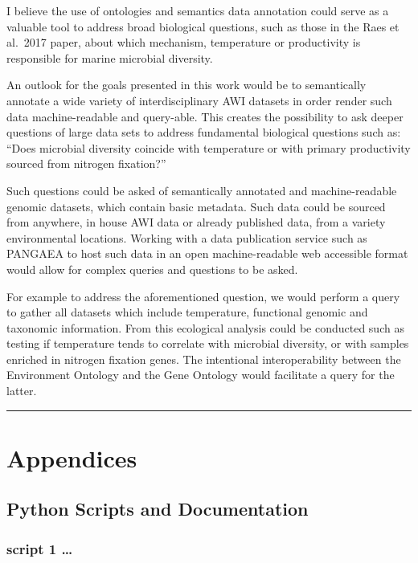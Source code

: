 \documentclass[]{article}
\begin{document}
I believe the use of ontologies and semantics data annotation could
serve as a valuable tool to address broad biological questions, such as
those in the Raes et al.~2017 paper, about which mechanism, temperature
or productivity is responsible for marine microbial diversity.

An outlook for the goals presented in this work would be to semantically
annotate a wide variety of interdisciplinary AWI datasets in order
render such data machine-readable and query-able. This creates the
possibility to ask deeper questions of large data sets to address
fundamental biological questions such as: ``Does microbial diversity
coincide with temperature or with primary productivity sourced from
nitrogen fixation?''

Such questions could be asked of semantically annotated and
machine-readable genomic datasets, which contain basic metadata. Such
data could be sourced from anywhere, in house AWI data or already
published data, from a variety environmental locations. Working with a
data publication service such as PANGAEA to host such data in an open
machine-readable web accessible format would allow for complex queries
and questions to be asked.

For example to address the aforementioned question, we would perform a
query to gather all datasets which include temperature, functional
genomic and taxonomic information. From this ecological analysis could
be conducted such as testing if temperature tends to correlate with
microbial diversity, or with samples enriched in nitrogen fixation
genes. The intentional interoperability between the Environment Ontology
and the Gene Ontology would facilitate a query for the latter.

\begin{center}\rule{0.5\linewidth}{\linethickness}\end{center}

\hypertarget{appendices}{%
\section{Appendices}\label{appendices}}

\hypertarget{python-scripts-and-documentation}{%
\subsection{Python Scripts and
Documentation}\label{python-scripts-and-documentation}}

\hypertarget{script-1}{%
\subsubsection{script 1 \ldots{}}\label{script-1}}
\end{document}
